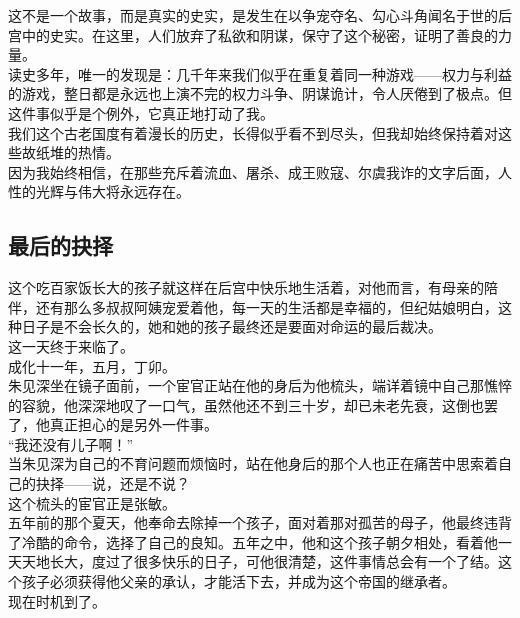 \begin{multicols}{\theparacolNo}
这不是一个故事，而是真实的史实，是发生在以争宠夺名、勾心斗角闻名于世的后宫中的史实。在这里，人们放弃了私欲和阴谋，保守了这个秘密，证明了善良的力量。\\

读史多年，唯一的发现是：几千年来我们似乎在重复着同一种游戏——权力与利益的游戏，整日都是永远也上演不完的权力斗争、阴谋诡计，令人厌倦到了极点。但这件事似乎是个例外，它真正地打动了我。\\

我们这个古老国度有着漫长的历史，长得似乎看不到尽头，但我却始终保持着对这些故纸堆的热情。\\

因为我始终相信，在那些充斥着流血、屠杀、成王败寇、尔虞我诈的文字后面，人性的光辉与伟大将永远存在。\\

\subsection{最后的抉择}
这个吃百家饭长大的孩子就这样在后宫中快乐地生活着，对他而言，有母亲的陪伴，还有那么多叔叔阿姨宠爱着他，每一天的生活都是幸福的，但纪姑娘明白，这种日子是不会长久的，她和她的孩子最终还是要面对命运的最后裁决。\\

这一天终于来临了。\\

成化十一年，五月，丁卯。\\

朱见深坐在镜子面前，一个宦官正站在他的身后为他梳头，端详着镜中自己那憔悴的容貌，他深深地叹了一口气，虽然他还不到三十岁，却已未老先衰，这倒也罢了，他真正担心的是另外一件事。\\

“我还没有儿子啊！”\\

当朱见深为自己的不育问题而烦恼时，站在他身后的那个人也正在痛苦中思索着自己的抉择——说，还是不说？\\

这个梳头的宦官正是张敏。\\

五年前的那个夏天，他奉命去除掉一个孩子，面对着那对孤苦的母子，他最终违背了冷酷的命令，选择了自己的良知。五年之中，他和这个孩子朝夕相处，看着他一天天地长大，度过了很多快乐的日子，可他很清楚，这件事情总会有一个了结。这个孩子必须获得他父亲的承认，才能活下去，并成为这个帝国的继承者。\\

现在时机到了。\\


\end{multicols}
